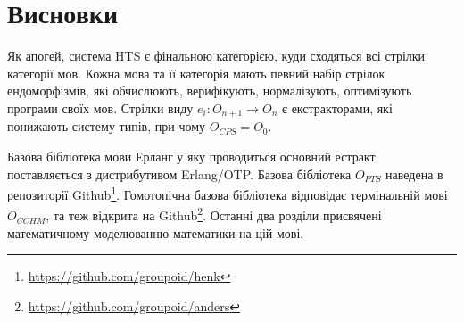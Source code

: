 \section{Висновки}
Як апогей, система HTS є фінальною категорією,
куди сходяться всі стрілки категорії мов. Кожна мова та її категорія
мають певний набір стрілок ендоморфізмів, які обчислюють, верифікують,
нормалізують, оптимізують програми своїх мов.
Стрілки виду $e_i: O_{n+1} \rightarrow O_n$ є екстракторами, які понижають систему типів,
при чому $O_{CPS} = O_0$.

Базова бібліотека мови Ерланг у яку проводиться основний
естракт, поставляється з дистрибутивом Erlang/OTP. Базова бібліотека
$O_{PTS}$ наведена в репозиторії Github\footnote{\url{https://github.com/groupoid/henk}}.
Гомотопічна базова бібліотека відповідає термінальній мові $O_{CCHM}$, та теж відкрита
на Github\footnote{\url{https://github.com/groupoid/anders}}.
Останні два розділи присвячені математичному моделюванню математики на цій мові.

